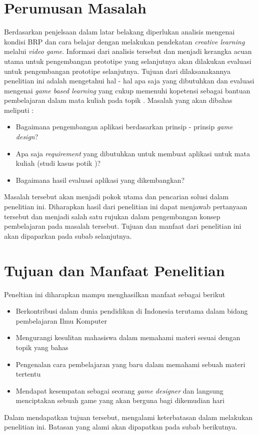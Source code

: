 \section{Perumusan Masalah}
Berdasarkan penjelsaan dalam latar belakang diperlukan analisis mengenai kondisi BRP dan cara belajar dengan melakukan pendekatan \textit{creative learning} melalui \textit{video game}. Informasi dari analisis tersebut dan menjadi kerangka acuan utama untuk pengembangan prototipe \game yang selanjutnya akan dilakukan evaluasi untuk pengembangan prototipe selanjutnya.
\linebreak\linebreak
Tujuan dari dilaksanakannya penelitian ini adalah mengetahui hal - hal apa saja yang dibutuhkan dan evaluasi mengenai \textit{game based learning} yang cukup memenuhi kopetensi sebagai bantuan pembelajaran dalam mata kuliah \ddp  pada topik \topik. Masalah yang akan dibahas meliputi :
\begin{itemize}
	\item Bagaimana pengembangan aplikasi \game berdasarkan prinsip - prinsip \textit{game design}?
	\item Apa saja \textit{requirement} yang dibutuhkan untuk membuat aplikasi \game untuk mata kuliah \ddp (studi kasus potik \topik)?
	\item Bagaimana hasil evaluasi aplikasi \game yang dikembangkan?
\end{itemize}
Masalah tersebut akan menjadi pokok utama dan pencarian solusi dalam penelitian ini. Diharapkan hasil dari penelitian ini dapat menjawab pertanyaan tersebut dan menjadi salah satu rujukan dalam pengembangan konsep pembelajaran pada masalah tersebut. Tujuan dan manfaat dari penelitian ini akan dipaparkan pada subab selanjutnya.

\section{Tujuan dan Manfaat Penelitian}
Peneltian ini diharapkan mampu menghasilkan manfaat sebagai berikut
\begin{itemize}
	\item Berkontribusi dalam dunia pendidikan di Indonesia terutama dalam bidang pembelajaran Ilmu Komputer
	\item Mengurangi kesulitan mahasiswa dalam memahami materi sesuai dengan topik yang \saya bahas
	\item Pengenalan cara pembelajaran yang baru dalam memahami sebuah materi tertentu
	\item Mendapat kesempatan sebagai seorang \textit{game designer} dan langsung menciptakan sebuah game yang akan berguna bagi \saya dikemudian hari
\end{itemize}
Dalam mendapatkan tujuan tersebut, \saya mengalami keterbatasan dalam melakukan penelitian ini. Batasan yang \saya alami akan dipapatkan pada subab berikutnya.

